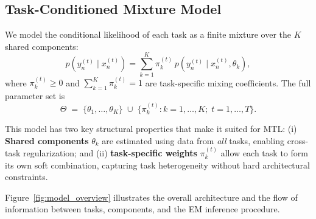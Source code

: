 \documentclass[preprint,12pt]{elsarticle}
\begin{document}
	\subsection{Task-Conditioned Mixture Model}
	
	We model the conditional likelihood of each task as a finite mixture
	over the $K$ shared components:
	\begin{equation}
		p\!\left(y_n^{(t)} \mid x_n^{(t)}\right)
		= \sum_{k=1}^K \pi_k^{(t)}\,
		p\!\left(y_n^{(t)} \mid x_n^{(t)}, \theta_k\right),
		\label{eq:mixture}
	\end{equation}
	where $\pi_k^{(t)} \ge 0$ and $\sum_{k=1}^K \pi_k^{(t)} = 1$ are
	task-specific mixing coefficients. The full parameter set is
	\[
	\Theta \;=\; \bigl\{\theta_1,\dots,\theta_K\bigr\}
	\;\cup\;
	\bigl\{\pi_k^{(t)} : k=1,\dots,K;\; t=1,\dots,T\bigr\}.
	\]
	
	This model has two key structural properties that make it suited for MTL:
	(i) \textbf{Shared components} $\theta_k$ are estimated using data from
	\emph{all} tasks, enabling cross-task regularization; and
	(ii) \textbf{task-specific weights} $\pi_k^{(t)}$ allow each task to
	form its own soft combination, capturing task heterogeneity without hard
	architectural constraints.
	
	Figure~\ref{fig:model_overview} illustrates the overall architecture
	and the flow of information between tasks, components, and the EM
	inference procedure.
	
\end{document}
